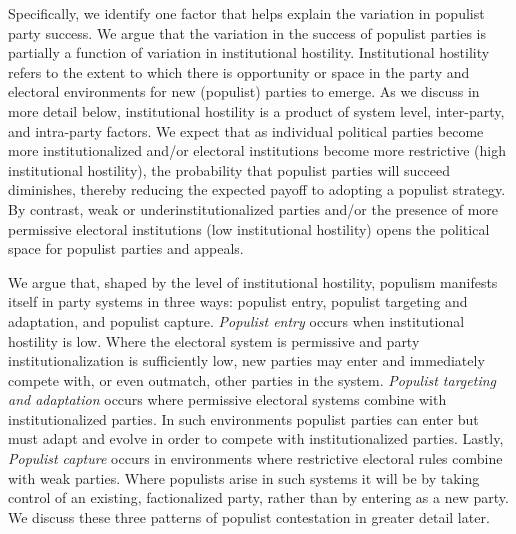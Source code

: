 \documentclass[a4paper,12pt]{article}\usepackage[]{graphicx}\usepackage[]{color}
\begin{document}
\par
Specifically, we identify one factor that helps explain the variation in populist party success. We argue that the variation in the success of populist parties is partially a function of variation in institutional hostility. Institutional hostility refers to the extent to which there is opportunity or space in the party and electoral environments for new (populist) parties to emerge. As we discuss in more detail below, institutional hostility is a product of system level, inter-party, and intra-party factors. We expect that as individual political parties become more institutionalized and/or electoral institutions become more restrictive (high institutional hostility), the probability that populist parties will succeed diminishes, thereby reducing the expected payoff to adopting a populist strategy. By contrast, weak or underinstitutionalized parties and/or the presence of more permissive electoral institutions (low institutional hostility) opens the political space for populist parties and appeals. 

\par
We argue that, shaped by the level of institutional hostility, populism manifests itself in party systems in three ways: populist entry, populist targeting and adaptation, and populist capture. \textit{Populist entry} occurs when institutional hostility is low. Where the electoral system is permissive and party institutionalization is sufficiently low, new parties may enter and immediately compete with, or even outmatch, other parties in the system. \textit{Populist targeting and adaptation} occurs where permissive electoral systems combine with institutionalized parties. In such environments populist parties can enter but must adapt and evolve in order to compete with institutionalized parties. Lastly, \textit{Populist capture} occurs in environments where restrictive electoral rules combine with weak parties. Where populists arise in such systems it will be by taking control of an existing, factionalized party, rather than by entering as a new party. We discuss these three patterns of populist contestation in greater detail later.
\end{document}

